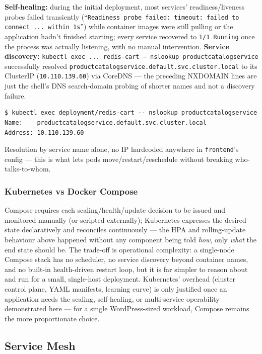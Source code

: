 \documentclass[a4paper,11pt]{article}
\begin{document}
\textbf{Self-healing:} during the initial deployment, most services' readiness/liveness probes
failed transiently (``\texttt{Readiness probe failed: timeout: failed to connect ... within 1s}'')
while container images were still pulling or the application hadn't finished starting; every
service recovered to \texttt{1/1 Running} once the process was actually listening, with no manual
intervention. \textbf{Service discovery:} \texttt{kubectl exec ... redis-cart -- nslookup
productcatalogservice} successfully resolved \texttt{productcatalogservice.default.svc.cluster.local}
to its ClusterIP (\texttt{10.110.139.60}) via CoreDNS — the preceding NXDOMAIN lines are just the
shell's DNS search-domain probing of shorter names and not a discovery failure.

\begin{verbatim}
$ kubectl exec deployment/redis-cart -- nslookup productcatalogservice
Name:    productcatalogservice.default.svc.cluster.local
Address: 10.110.139.60
\end{verbatim}
Resolution by service name alone, no IP hardcoded anywhere in \texttt{frontend}'s config — this
is what lets pods move/restart/reschedule without breaking who-talks-to-whom.

\subsubsection{Kubernetes vs Docker Compose}

Compose requires each scaling/health/update decision to be issued and monitored manually (or
scripted externally); Kubernetes expresses the desired state declaratively and reconciles
continuously — the HPA and rolling-update behaviour above happened without any component being
told \emph{how}, only \emph{what} the end state should be. The trade-off is operational complexity:
a single-node Compose stack has no scheduler, no service discovery beyond container names, and
no built-in health-driven restart loop, but it is far simpler to reason about and run for a small,
single-host deployment. Kubernetes' overhead (cluster control plane, YAML manifests, learning
curve) is only justified once an application needs the scaling, self-healing, or multi-service
operability demonstrated here — for a single WordPress-sized workload, Compose remains the more
proportionate choice.

\subsection{Service Mesh}
\label{sec:mesh-results}
\end{document}
